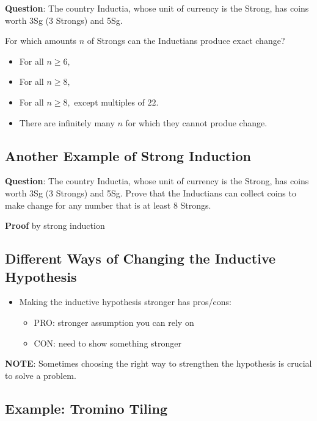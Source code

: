 \documentclass[11pt]{article}
\providecommand{\tightlist}{%
       \setlength{\itemsep}{0pt}\setlength{\parskip}{0pt}}
\begin{document}
 \textbf{Question}: The country Inductia, whose unit of currency is the
 Strong, has coins worth 3Sg (3 Strongs) and 5Sg.
 
 For which amounts \(n\) of Strongs can the Inductians produce exact
 change?
 
 \begin{itemize}
 \item For all $n \geq 6,$
 \item For all $n \geq 8,$
 \item For all $n \geq 8,$ except multiples of $22$.
 \item There are infinitely many $n$ for which they cannot produe change.
 \end{itemize}
 
     \subsection{Another Example of Strong
 Induction}\label{another-example-of-strong-induction}
 
 \textbf{Question}: The country Inductia, whose unit of currency is the
 Strong, has coins worth 3Sg (3 Strongs) and 5Sg. Prove that the
 Inductians can collect coins to make change for any number that is at
 least 8 Strongs.
 
 \textbf{Proof} by strong induction
 
     \subsection{Different Ways of Changing the Inductive
 Hypothesis}\label{different-ways-of-changing-the-inductive-hypothesis}
 
 \begin{itemize}
 \tightlist
 \item
   Making the inductive hypothesis stronger has pros/cons:
 
   \begin{itemize}
   \tightlist
   \item
     PRO: stronger assumption you can rely on
   \item
     CON: need to show something stronger
   \end{itemize}
 \end{itemize}
 
     \textbf{NOTE}: Sometimes choosing the right way to strengthen the
 hypothesis is crucial to solve a problem.
 
     \subsection{Example: Tromino Tiling}\label{example-tromino-tiling}
 
\end{document}
